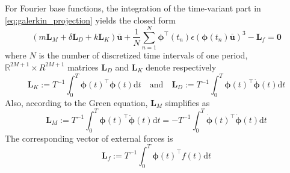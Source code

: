 \documentclass[10pt,letterpaper]{article}
\begin{document}
For Fourier base functions, the integration of the time-variant part in \eqref{eq:galerkin_projection} yields the closed form
\begin{equation}\label{eq:closed_form}
	(m\mathbf L_M + \delta \mathbf L_D + k\mathbf L_K) \bar{\mathbf u} + \frac{1}{N}\sum_{n=1}^N \boldsymbol{\phi}^\top(t_n) \epsilon ( \boldsymbol{\phi}(t_n) \bar{\mathbf u} )^3 - \mathbf L_f= \mathbf 0
\end{equation}
where $N$ is the number of discretized time intervals of one period, $\mathbb R^{2M+1}\times R^{2M+1}$ matrices $\mathbf L_D$ and $\mathbf L_K$ denote respectively
\begin{equation}\label{eq:periodic/hbm_shape_2}
\mathbf L_K := T^{-1} \int_0^{T} \boldsymbol\phi(t)^\top \boldsymbol\phi(t) \mathrm d t
\quad\text{and}\quad
\mathbf L_D := T^{-1} \int_0^{T} \boldsymbol\phi(t)^\top\dot{\boldsymbol\phi}(t) \mathrm d t
\end{equation}
Also, according to the Green equation, $\mathbf L_M$ simplifies as
\begin{equation}\label{eq:periodic/hbm_shape_3}
\mathbf L_M
:= T^{-1} \int_0^{T} \boldsymbol\phi(t)^\top\ddot{\boldsymbol\phi}(t) \mathrm d t
=- T^{-1} \int_0^{T} \dot{\boldsymbol\phi}(t)^\top\dot{\boldsymbol\phi}(t) \mathrm d t
\end{equation}
The corresponding vector of external forces is
\begin{equation}\label{eq:periodic/hbm_shape_4}
\mathbf L_f
:= T^{-1} \int_0^{T} \boldsymbol\phi(t)^\top f(t) \mathrm d t 
\end{equation}

\end{document}
